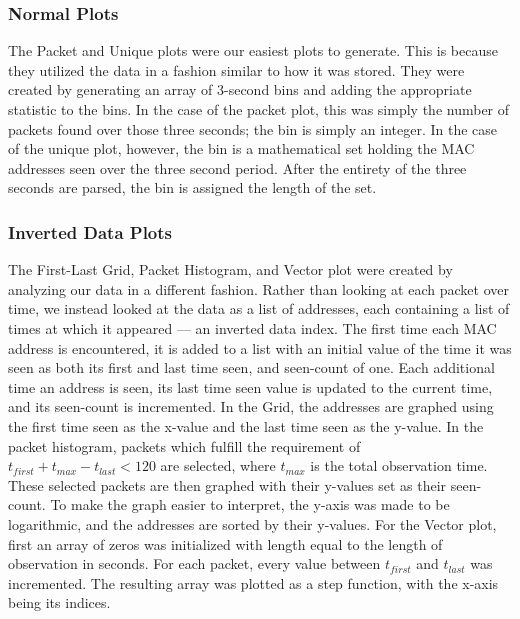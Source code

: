 \subsubsection*{Normal Plots}
The Packet and Unique plots were our easiest plots to generate.
This is because they utilized the data in a fashion similar to how it was stored.
They were created by generating an array of 3-second bins and adding the appropriate statistic to the bins.
In the case of the packet plot, this was simply the number of packets found over those three seconds; the bin is simply an integer.
In the case of the unique plot, however, the bin is a mathematical set holding the MAC addresses seen over the three second period.
After the entirety of the three seconds are parsed, the bin is assigned the length of the set.

\subsubsection*{Inverted Data Plots}
The First-Last Grid, Packet Histogram, and Vector plot were created by analyzing our data in a different fashion.
Rather than looking at each packet over time, we instead looked at the data as a list of addresses, each containing a list of times at which it appeared --- an inverted data index.
The first time each MAC address is encountered, it is added to a list with an initial value of the time it was seen as both its first and last time seen, and seen-count of one.
Each additional time an address is seen, its last time seen value is updated to the current time, and its seen-count is incremented.
In the Grid, the addresses are graphed using the first time seen as the x-value and the last time seen as the y-value.
In the packet histogram, packets which fulfill the requirement of \(t_{first} + t_{max} - t_{last} < 120\) are selected, where \(t_{max}\) is the total observation time.
These selected packets are then graphed with their y-values set as their seen-count.
To make the graph easier to interpret, the y-axis was made to be logarithmic, and the addresses are sorted by their y-values.
For the Vector plot, first an array of zeros was initialized with length equal to the length of observation in seconds.
For each packet, every value between \(t_{first}\) and \(t_{last}\) was incremented.
The resulting array was plotted as a step function, with the x-axis being its indices.

